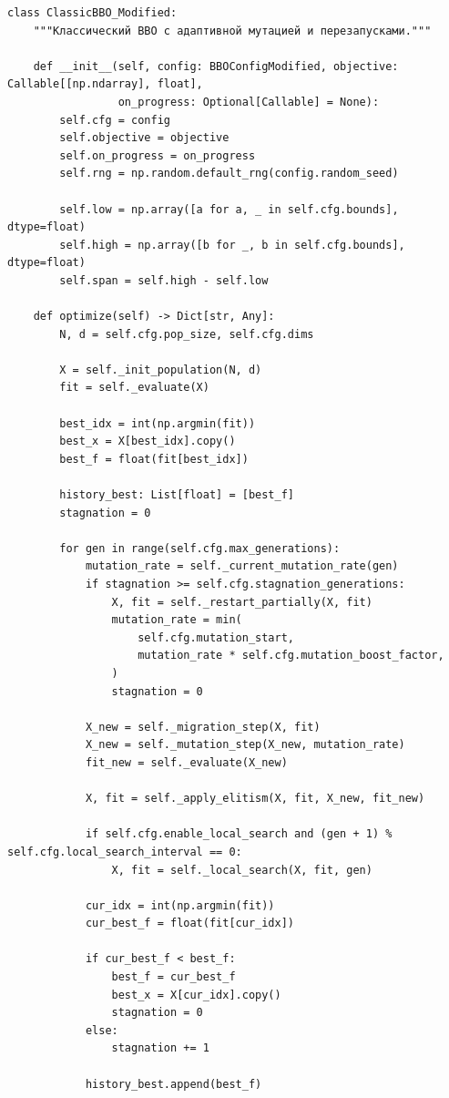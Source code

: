 \begin{lstlisting}
class ClassicBBO_Modified:
    """Классический BBO с адаптивной мутацией и перезапусками."""

    def __init__(self, config: BBOConfigModified, objective: Callable[[np.ndarray], float],
                 on_progress: Optional[Callable] = None):
        self.cfg = config
        self.objective = objective
        self.on_progress = on_progress
        self.rng = np.random.default_rng(config.random_seed)

        self.low = np.array([a for a, _ in self.cfg.bounds], dtype=float)
        self.high = np.array([b for _, b in self.cfg.bounds], dtype=float)
        self.span = self.high - self.low

    def optimize(self) -> Dict[str, Any]:
        N, d = self.cfg.pop_size, self.cfg.dims

        X = self._init_population(N, d)
        fit = self._evaluate(X)

        best_idx = int(np.argmin(fit))
        best_x = X[best_idx].copy()
        best_f = float(fit[best_idx])

        history_best: List[float] = [best_f]
        stagnation = 0

        for gen in range(self.cfg.max_generations):
            mutation_rate = self._current_mutation_rate(gen)
            if stagnation >= self.cfg.stagnation_generations:
                X, fit = self._restart_partially(X, fit)
                mutation_rate = min(
                    self.cfg.mutation_start,
                    mutation_rate * self.cfg.mutation_boost_factor,
                )
                stagnation = 0

            X_new = self._migration_step(X, fit)
            X_new = self._mutation_step(X_new, mutation_rate)
            fit_new = self._evaluate(X_new)

            X, fit = self._apply_elitism(X, fit, X_new, fit_new)

            if self.cfg.enable_local_search and (gen + 1) % self.cfg.local_search_interval == 0:
                X, fit = self._local_search(X, fit, gen)

            cur_idx = int(np.argmin(fit))
            cur_best_f = float(fit[cur_idx])

            if cur_best_f < best_f:
                best_f = cur_best_f
                best_x = X[cur_idx].copy()
                stagnation = 0
            else:
                stagnation += 1

            history_best.append(best_f)


\end{lstlisting}
